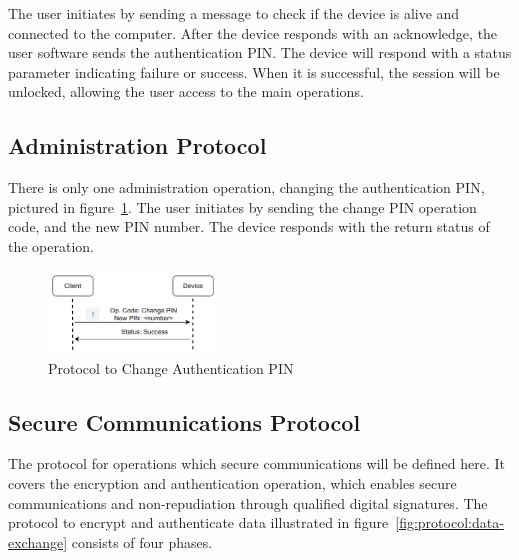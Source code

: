 The user initiates by sending a message to check if the device is alive and connected to the computer. After the device responds with an acknowledge, the user software sends the authentication \ac{PIN}. The device will respond with a status parameter indicating failure or success. When it is successful, the session will be unlocked, allowing the user access to the main operations.

\subsection{Administration Protocol}\label{chap:implementation:protocol:admin}

There is only one administration operation, changing the authentication \ac{PIN}, pictured in figure~\ref{fig:protocol:change-PIN}.
The user initiates by sending the change \ac{PIN} operation code, and the new \ac{PIN} number. The device responds with the return status of the operation.

\begin{figure}[h!]
	\centering
	\includegraphics[width=0.4\textwidth]{./Images/change-PIN.png}
	\caption{Protocol to Change Authentication PIN}
	\label{fig:protocol:change-PIN}
\end{figure}

\subsection{Secure Communications Protocol}\label{chap:implementation:protocol:comms}

The protocol for operations which secure communications will be defined here. It covers the encryption and authentication operation, which enables secure communications and non-repudiation through qualified digital signatures.
The protocol to encrypt and authenticate data illustrated in figure~\ref{fig:protocol:data-exchange} consists of four phases.


